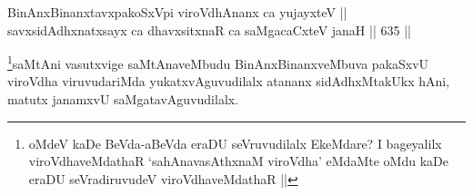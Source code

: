 
\begin{shl}
BinAnxBinanxtavxpakoSxV\s pi viroVdhAnanx ca yujayxteV || \\
savxsidAdhxnatxsayx ca dhavxsitxnaR ca saMgacaCxteV janaH ||  635 ||  
\end{shl}

\begin{artha}
\footnote{oMdeV kaDe BeVda-aBeVda eraDU seVruvudilalx EkeMdare? I bageyalilx viroVdhaveMdathaR `sahAnavasAthxnaM viroVdha' eMdaMte oMdu kaDe eraDU seVradiruvudeV viroVdhaveMdathaR ||}saMtAni vasutxvige saMtAnaveMbudu BinAnxBinanxveMbuva pakaSxvU viroVdha viruvudariMda yukatxvAguvudilalx atananx sidAdhxMtakUkx hAni, matutx janamxvU saMgatavAguvudilalx.
\end{artha}

